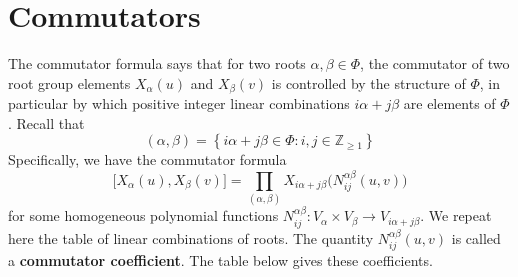 \documentclass[11pt]{article}
\newcommand{\tbf}{\textbf}
\newcommand{\lb}{\left\{}
\newcommand{\rb}{\right\}}
\newcommand{\Z}{\mathbb{Z}}
\theoremstyle{definition}
\newif\ifsummablepairs
\begin{document}
\fi

\newpage
\section{Commutators}

The commutator formula says that for two roots $\alpha, \beta \in \Phi$, the commutator of two root group elements $X_\alpha(u)$ and $X_\beta(v)$ is controlled by the structure of $\Phi$, in particular by which positive integer linear combinations $i\alpha + j\beta$ are elements of $\Phi$. Recall that
\[
	(\alpha, \beta) = \lb i \alpha + j\beta \in \Phi : i, j \in \Z_{\ge 1} \rb
\]
Specifically, we have the commutator formula
\[
	\Big[ X_\alpha(u), X_\beta(v) \Big] = \prod_{(\alpha, \beta)} X_{i\alpha + j\beta} \Big( N_{ij}^{\alpha \beta}(u,v) \Big)
\]
for some homogeneous polynomial functions $N_{ij}^{\alpha \beta}:V_{\alpha} \times V_{\beta} \to V_{i\alpha+j\beta}$. 
\ifsummablepairs
We repeat here the table of linear combinations of roots. The quantity $N_{ij}^{\alpha \beta}(u,v)$ is called a \tbf{commutator coefficient}. The table below gives these coefficients.

\bigskip
\end{document}
